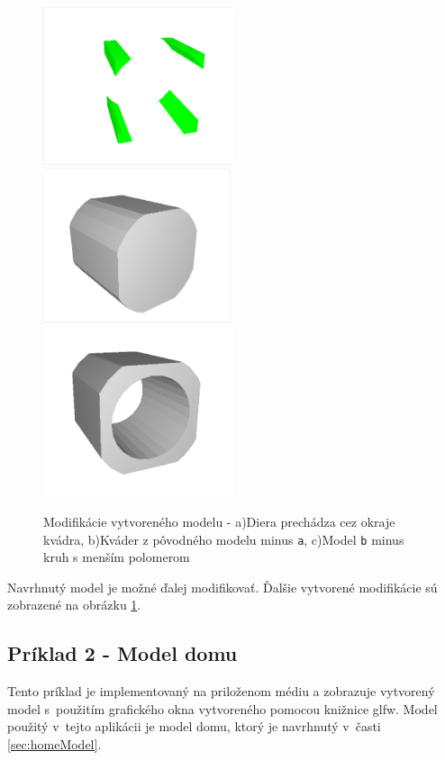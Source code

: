 \begin{figure}[H]
	\centering
	\includegraphics[trim=10 10 10 10,clip,width=0.50\textwidth]{obrazky-figures/Examples/kvader s dierou4.png}
	\includegraphics[trim=10 10 10 10,clip,width=0.49\textwidth]{obrazky-figures/Examples/followUp.png}
	\includegraphics[trim=10 10 10 10,clip,width=0.50\textwidth]{obrazky-figures/Examples/followup3.png}
	\caption{Modifikácie vytvoreného modelu - a)Diera prechádza cez okraje kvádra, b)Kváder z pôvodného modelu minus \texttt{a}, c)Model \texttt{b} minus kruh s menším polomerom}
	\label{fig:qwert}
\end{figure}

Navrhnutý model je možné ďalej modifikovať. Ďalšie vytvorené modifikácie sú zobrazené na obrázku \ref{fig:qwert}.



\newpage
\subsection*{Príklad 2 - Model domu}\label{priklad2}
Tento príklad je implementovaný na priloženom médiu a zobrazuje vytvorený model s~použitím grafického okna vytvoreného pomocou knižnice glfw. Model použitý v~tejto aplikácii je model domu, ktorý je navrhnutý v~časti \ref{sec:homeModel}.


